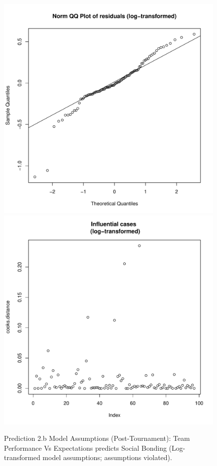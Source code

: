 \begin{CJK}{UTF8}{gbsn}
\begin{figure}[htbp]
        \includegraphics[scale =.4]{images/MLM23bLogQQNorm.pdf}
        \includegraphics[scale =.4]{images/MLM23bLogCooksD.pdf}
        \caption{Prediction 2.b Model Assumptions (Post-Tournament): Team Performance Vs Expectations predicts Social Bonding (Log-transformed model assumptions; assumptions violated).}
        \label{fig:MLM3bLogAssumptions}
      \end{figure}



\end{CJK}
